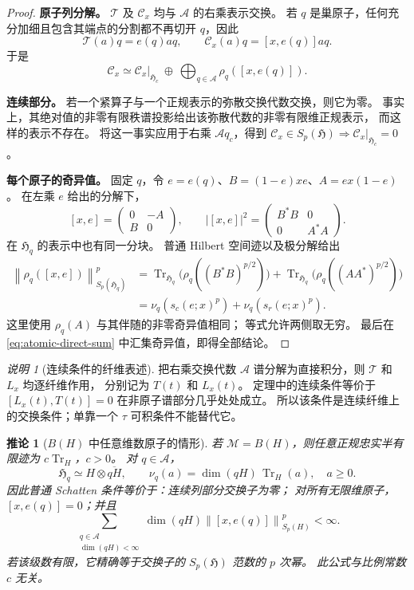 \documentclass[UTF8,11pt,a4paper,fontset=fandol]{ctexart}
\newtheorem{corollary}[theorem]{推论}
\theoremstyle{remark}
\newtheorem{remark}[theorem]{说明}
\numberwithin{equation}{section}
\newcommand{\M}{\mathcal M}
\newcommand{\T}{\mathcal T}
\newcommand{\CC}{\mathcal C}
\newcommand{\HH}{\mathfrak H}
\newcommand{\Tr}{\operatorname{Tr}}
\newcommand{\norm}[1]{\left\lVert #1\right\rVert}
\begin{document}
\begin{proof}
\textbf{原子列分解。}
$\T$ 及 $\CC_x$ 均与 $\mathcal A$ 的右乘表示交换。
若 $q$ 是巢原子，任何充分加细且包含其端点的分割都不再切开 $q$，因此
\[
 \T(a)q=e(q)aq,\qquad
 \CC_x(a)q=[x,e(q)]aq.
\]
于是
\begin{equation}\label{eq:atomic-direct-sum}
 \CC_x\simeq
 \CC_x|_{\HH_c}\ \oplus\
 \bigoplus_{q\in\mathscr A}\rho_q([x,e(q)]).
\end{equation}

\medskip
\textbf{连续部分。}
若一个紧算子与一个正规表示的弥散交换代数交换，则它为零。
事实上，其绝对值的非零有限秩谱投影给出该弥散代数的非零有限维正规表示，
而这样的表示不存在。
将这一事实应用于右乘 $\mathcal A q_c$，得到
$\CC_x\in S_p(\HH)\Rightarrow\CC_x|_{\HH_c}=0$。

\medskip
\textbf{每个原子的奇异值。}
固定 $q$，令 $e=e(q)$、$B=(1-e)xe$、$A=ex(1-e)$。
在左乘 $e$ 给出的分解下，
\[
 [x,e]=\begin{pmatrix}0&-A\\B&0\end{pmatrix},\qquad
 |[x,e]|^2=\begin{pmatrix}B^*B&0\\0&A^*A\end{pmatrix}.
\]
在 $\HH_q$ 的表示中也有同一分块。
普通 Hilbert 空间迹以及极分解给出
\begin{align*}
 \norm{\rho_q([x,e])}_{S_p(\HH_q)}^p
 &=\Tr_{\HH_q}\bigl(\rho_q((B^*B)^{p/2})\bigr)
   +\Tr_{\HH_q}\bigl(\rho_q((AA^*)^{p/2})\bigr)\\
 &=\nu_q(s_c(e;x)^p)+\nu_q(s_r(e;x)^p).
\end{align*}
这里使用 $\rho_q(A)$ 与其伴随的非零奇异值相同；
等式允许两侧取无穷。
最后在 \eqref{eq:atomic-direct-sum} 中汇集奇异值，即得全部结论。
\end{proof}

\begin{remark}[连续条件的纤维表述]
把右乘交换代数 $\mathcal A$ 谱分解为直接积分，则 $\T$ 和 $L_x$ 均逐纤维作用，
分别记为 $T(t)$ 和 $L_x(t)$。
定理中的连续条件等价于
$[L_x(t),T(t)]=0$ 在非原子谱部分几乎处处成立。
所以该条件是连续纤维上的交换条件；单靠一个 $\tau$ 可积条件不能替代它。
\end{remark}

\begin{corollary}[$B(H)$ 中任意维数原子的情形]\label{cor:typeI}
若 $\M=B(H)$，则任意正规忠实半有限迹为 $c\Tr_H$，$c>0$。
对 $q\in\mathscr A$，
\[
 \HH_q\simeq H\otimes\overline{qH},\qquad
 \nu_q(a)=\dim(qH)\,\Tr_H(a),\quad a\geq0.
\]
因此普通 Schatten 条件等价于：连续列部分交换子为零；
对所有无限维原子，$[x,e(q)]=0$；并且
\[
 \sum_{\substack{q\in\mathscr A\\\dim(qH)<\infty}}
   \dim(qH)\norm{[x,e(q)]}_{S_p(H)}^p<\infty.
\]
若该级数有限，它精确等于交换子的 $S_p(\HH)$ 范数的 $p$ 次幂。
此公式与比例常数 $c$ 无关。
\end{corollary}
\end{document}
